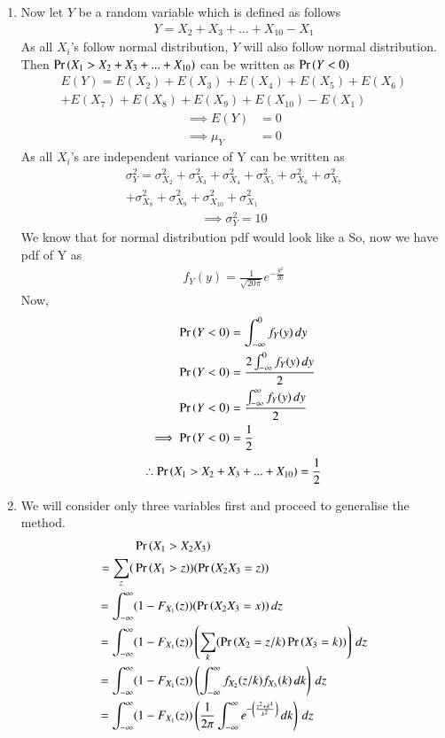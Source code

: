 \documentclass[journal,12pt,twocolumn]{IEEEtran}
\begin{document}
\begin{enumerate}[label = (\Alph*)]
    \item Now let $Y$ be a random variable which is defined as follows 
\begin{align}
    Y=X_2+X_3+...+X_{10}-X_{1}
\end{align}
As all $X_i$'s follow normal distribution, $Y$ will also follow normal distribution.\\
Then $\Pr\left(X_1>X_2+X_3+...+X_{10}\right)$ can be written as $\Pr\left(Y<0\right)$
\begin{multline}
   E(Y)=E(X_2)+E(X_3)+E(X_4)+E(X_5)+E(X_6)\\
   +E(X_7)+E(X_8)+E(X_9)+E(X_{10})-E(X_1) 
\end{multline}
\begin{align}
    \implies E(Y)&=0\\
    \implies \mu_Y&=0
\end{align}
As all $X_i$'s are independent variance of Y can be written as
\begin{multline}
   \sigma^2_Y =  \sigma^2_{X_2}+\sigma^2_{X_3}+\sigma^2_{X_4}+\sigma^2_{X_5}+\sigma^2_{X_6}+\sigma^2_{X_7}\\
   +\sigma^2_{X_8}+\sigma^2_{X_9}+\sigma^2_{X_{10}}+\sigma^2_{X_1}
\end{multline}
\begin{align}
    \implies \sigma^2_Y=10
\end{align}
We know that for normal distribution pdf would look like 
a
So, now we have pdf of Y as
\begin{align}
    f_Y(y)=\frac{1}{\sqrt{20\pi}}e^{-\frac{y^2}{20}}
\end{align}
Now,
\begin{align}
    \Pr\left(Y<0\right)&=\int_{-\infty}^{0}f_Y(y) \, dy\\
    \Pr\left(Y<0\right)&=\frac{2\int_{-\infty}^{0}f_Y(y) \, dy}{2}\\
    \Pr\left(Y<0\right)&=\frac{\int_{-\infty}^{\infty}f_Y(y) \, dy}{2}\\
    \implies \Pr\left(Y<0\right)&=\frac{1}{2}
\end{align}
\begin{align}
    \therefore \Pr\left(X_1>X_2+X_3+...+X_{10}\right)=\frac{1}{2}
\end{align}
\item We will consider only three variables first and proceed to generalise the method.
\begin{align}
    &\Pr\left(X_1>X_2X_3\right)\\
    = \sum_z (&\Pr\left(X_1>z\right))(\Pr\left(X_2X_3=z\right))\\
    = \int_{-\infty}^{\infty}&(1-F_{X_1}(z))(\Pr\left(X_2X_3=x\right))\,dz\\
    = \int_{-\infty}^{\infty}&(1-F_{X_1}(z))\left(\sum_k(\Pr\left(X_2=z/k\right)\Pr\left(X_3=k\right))\right)\,dz\\
    = \int_{-\infty}^{\infty}&(1-F_{X_1}(z))\left(\int_{-\infty}^{\infty}f_{X_2}(z/k)f_{X_3}(k)\,dk\right)\,dz\\
    = \int_{-\infty}^{\infty}&(1-F_{X_1}(z))\left(\frac{1}{2\pi}\int_{-\infty}^{\infty} e^{-\left(\frac{z^2+k^4}{k^2}\right)}\,dk\right)\,dz
\end{align}
\end{enumerate}
\end{document}
